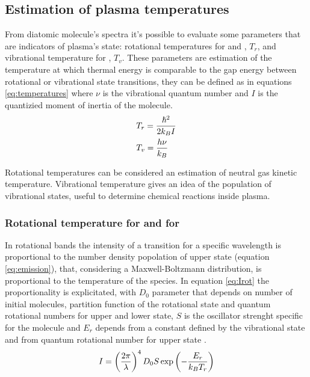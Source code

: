 \subsection{Estimation of plasma temperatures}
From diatomic molecule's spectra it's possible to evaluate some parameters that are indicators of plasma's state: rotational temperatures for  and , $T_{r}$, and vibrational temperature for , $T_{v}$.
These parameters are estimation of the temperature at which thermal energy is comparable to the gap energy between rotational or vibrational state transitions, they can be defined as in equations \ref{eq:temperatures} where $\nu$ is the vibrational quantum number and $I$ is the quantizied moment of inertia of the molecule.
\begin{equation}
 \centering
 \begin{split}
  &T_{r} = \frac{\hslash^2}{2 k_{B} I}\\
  &T_{v} = \frac{h \nu}{k_{B}}
 \end{split}
 \label{eq:temperatures}
\end{equation}

Rotational temperatures can be considered an estimation of neutral gas kinetic temperature. Vibrational temperature gives an idea of the population of vibrational states, useful to determine chemical reactions inside plasma.

\subsubsection{Rotational temperature for  and for }
In rotational bands the intensity of a transition for a specific wavelength is proportional to the number density popolation of upper state (equation \ref{eq:emission}), that, considering a Maxwell-Boltzmann distribution, is proportional to the temperature of the species. In equation \ref{eq:Irot} the proportionality is explicitated, with $D_{0}$ parameter that depends on number of initial molecules, partition function of the rotational state and quantum rotational numbers for upper and lower state, $S$ is the oscillator strenght specific for the molecule and $E_{r}$ depends from a constant defined by the vibrational state and from quantum rotational number for upper state \cite{MOON2003249}.
\begin{equation}
 \centering
 I = \left(\frac{2 \pi}{\lambda}\right)^4 D_0 S \exp\left(-\frac{E_r}{k_B T_r}\right)
 \label{eq:Irot}
\end{equation}

